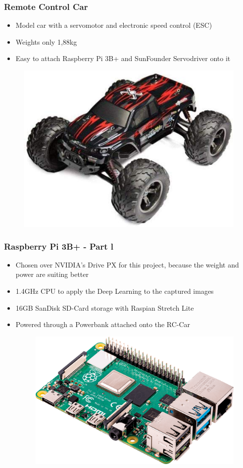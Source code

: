 \documentclass{beamer}
\begin{document}
\begin{frame}
\frametitle{Remote Control Car}
\begin{itemize}
\item Model car with a servomotor and electronic speed control (ESC)
\item Weights only 1,88kg
\item Easy to attach Raspberry Pi 3B+ and SunFounder Servodriver onto it
\end{itemize}
\begin{figure}
\includegraphics[width=0.4\linewidth]{photo/car.jpg}
\end{figure}
\end{frame}
\begin{frame}
\frametitle{Raspberry Pi 3B+ - Part l}
\begin{itemize}
\item Chosen over NVIDIA's Drive PX for this project, because the weight and power are suiting  better
\item 1.4GHz CPU to apply the Deep Learning to the captured images
\item 16GB SanDisk SD-Card storage with Raspian Stretch Lite
\item Powered through a Powerbank attached onto the RC-Car
\begin{figure}
\includegraphics[width=0.4\linewidth]{photo/raspi}
\end{figure}
\end{itemize}
\end{frame}

\end{document}
